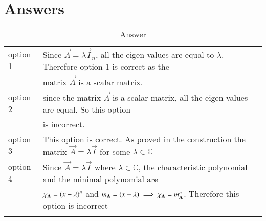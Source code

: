 \documentclass[journal,12pt]{IEEEtran}
\begin{document}
\section{Answers}
\renewcommand{\thetable}{1}
\begin{longtable}{|l|l|}
    \hline
    option 1 & Since $\vec{A}=\lambda\vec{I}_n$, all the eigen values are equal to $\lambda$. Therefore option 1 is correct as the \\
    &matrix $\vec{A}$ is a scalar matrix.\\
    \hline
    option 2 & since the matrix $\vec{A}$ is a scalar matrix, all the eigen values are equal. So this option \\
    &is incorrect.\\
    \hline
    option 3 & This option is correct. As proved in the construction the matrix $\vec{A}=\lambda\vec{I}$ for some $\lambda \in \mathbb{C}$\\
    \hline
    option 4 & Since $\vec{A}=\lambda\vec{I}$ where $\lambda\in\mathbb{C}$, the characteristic polynomial and the minimal polynomial are\\
    & $\chi_\mathbf{A}=\left(x-\lambda\right)^n$ and $m_\mathbf{A}=\left(x-\lambda\right)\implies\chi_\mathbf{A}=m_\mathbf{A}^n$. Therefore this option is incorrect\\
    \hline
    \caption{Answer}
    \label{tab:construction}
\end{longtable}
\end{document}
